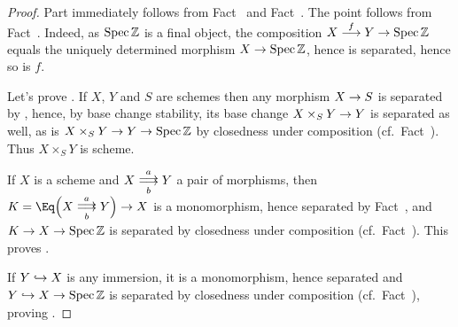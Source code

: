 \documentclass[a4paper,parskip=half,numbers=enddot, DIV=12]{scrreprt}
\begin{document}
\begin{proof}
    Part  immediately follows from Fact~ and Fact~. The point  follows from Fact~. Indeed, as $\operatorname{Spec}\mathbb{Z}$ is a final object, the composition $X\morphism[f]Y\morphism\Spec\IZ$ equals the uniquely determined morphism $X\morphism\Spec\IZ$, hence is separated, hence so is $f$.
    
    Let's prove . If $X$, $Y$ and $S$ are schemes then any morphism $X\morphism S$ is separated by , hence, by base change stability, its base change $X\times_S Y \morphism Y$ is separated as well, as is $X\times_S Y \morphism Y\morphism \Spec \IZ$ by closedness under composition (cf.\ Fact~). Thus $X\times_S Y$ is scheme. 
    
    If $X$ is a scheme and $X\doublemorphism[a][b] Y$ a pair of morphisms, then $K = \Eq\Big(X\doublemorphism[a][b] Y\Big) \morphism X$ is a monomorphism, hence separated by Fact~, and $K\morphism X\morphism \Spec \IZ$ is separated by closedness under composition (cf.\ Fact~). This proves .
    
    If $Y\monomorphism X$ is any immersion, it is a monomorphism, hence separated and $Y\monomorphism X\morphism \Spec \IZ$ is separated by closedness under composition (cf.\ Fact~), proving .
\end{proof}
\end{document}
